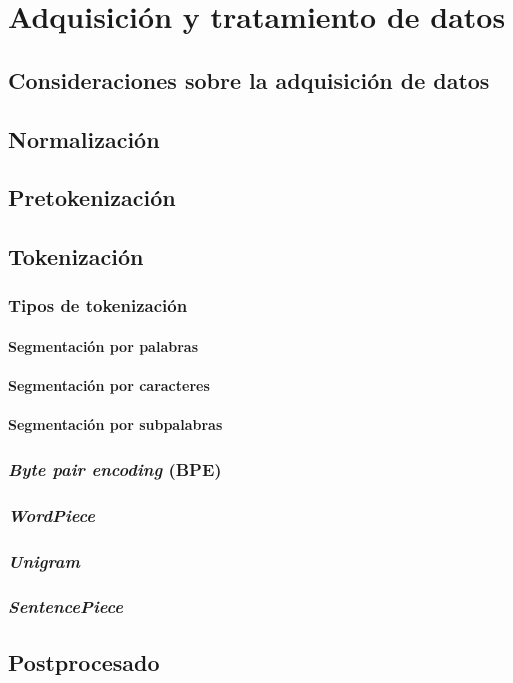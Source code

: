 \chapter{Adquisición y tratamiento de datos}
\section{Consideraciones sobre la adquisición de datos}
\section{Normalización}
\section{Pretokenización}
\section{Tokenización}
\subsection{Tipos de tokenización}
\subsubsection{Segmentación por palabras}
\subsubsection{Segmentación por caracteres}
\subsubsection{Segmentación por subpalabras}
\subsection{\textit{Byte pair encoding} (BPE)}
\subsection{\textit{WordPiece}}
\subsection{\textit{Unigram}}
\subsection{\textit{SentencePiece}}
\section{Postprocesado}